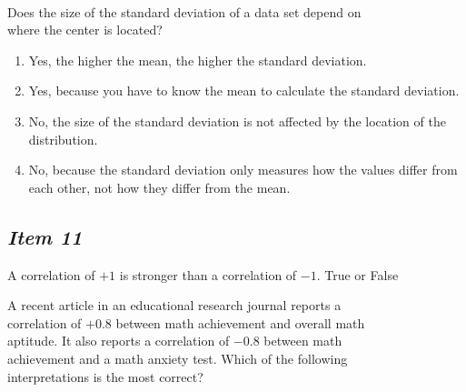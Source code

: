 \noindent{} \\


Does the size of the standard deviation of a data set depend on \\ \indent where the center is located?


\begin{enumerate} [leftmargin=1.5cm, itemsep=.2em]


\item Yes, the higher the mean, the higher the standard deviation.


\item Yes, because you have to know the mean to calculate the standard deviation.


\item No, the size of the standard deviation is not affected by the location of the distribution.


\item No, because the standard deviation only measures how the values differ from each other, not how they differ from the mean.


\end{enumerate}








\subsection{\textbf{\textit{Item 11}}}


A correlation of $+1$ is stronger than a correlation of $-1$. True or False\\


\vspace{8pt}





\noindent{}





A recent article in an educational research journal reports a \\ correlation of $+0.8$ between math achievement and overall math \\ aptitude. It also reports a correlation of $-0.8$ between math\\ achievement and a math anxiety test. Which of the following\\ interpretations is the most correct?



